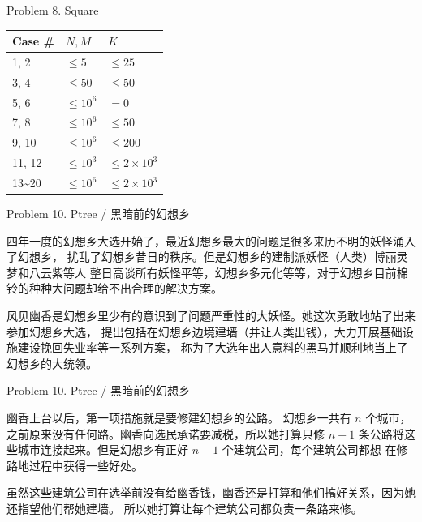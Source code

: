 \documentclass[UTF8]{beamer}
\begin{document}
\begin{frame}{Problem 8. Square}

\begin{tabularx}{\textwidth}{X|X|X} \hline
Case \# & $N, M$ & $K$ \\ \hline \hline
1, 2   & $\leq 5$    & $\leq 25$            \\ \hline
3, 4   & $\leq 50$   & $\leq 50$            \\ \hline
5, 6   & $\leq 10^6$ & $= 0$                \\ \hline
7, 8   & $\leq 10^6$ & $\leq 50$            \\ \hline
9, 10  & $\leq 10^6$ & $\leq 200$           \\ \hline
11, 12 & $\leq 10^3$ & $\leq 2 \times 10^3$ \\ \hline
13\textasciitilde 20 & $\leq 10^6$ & $\leq 2 \times 10^3$ \\ \hline
\end{tabularx}

\end{frame}


\begin{frame}{Problem 10. Ptree / 黑暗前的幻想乡}

四年一度的幻想乡大选开始了，最近幻想乡最大的问题是很多来历不明的妖怪涌入了幻想乡，
扰乱了幻想乡昔日的秩序。但是幻想乡的建制派妖怪（人类）博丽灵梦和八云紫等人
整日高谈所有妖怪平等，幻想乡多元化等等，对于幻想乡目前棉铃的种种大问题却给不出合理的解决方案。

风见幽香是幻想乡里少有的意识到了问题严重性的大妖怪。她这次勇敢地站了出来参加幻想乡大选，
提出包括在幻想乡边境建墙（并让人类出钱），大力开展基础设施建设挽回失业率等一系列方案，
称为了大选年出人意料的黑马并顺利地当上了幻想乡的大统领。

\end{frame}

\begin{frame}{Problem 10. Ptree / 黑暗前的幻想乡}

幽香上台以后，第一项措施就是要修建幻想乡的公路。
幻想乡一共有 $n$ 个城市，之前原来没有任何路。幽香向选民承诺要减税，所以她打算只修
$n - 1$ 条公路将这些城市连接起来。但是幻想乡有正好 $n - 1$ 个建筑公司，每个建筑公司都想
在修路地过程中获得一些好处。

虽然这些建筑公司在选举前没有给幽香钱，幽香还是打算和他们搞好关系，因为她还指望他们帮她建墙。
所以她打算让每个建筑公司都负责一条路来修。

\end{frame}
\end{document}

